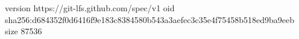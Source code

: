 version https://git-lfs.github.com/spec/v1
oid sha256:d684352f0d6416f9e183c8384580b543a3aefec3c35e4f75458b518ed9ba9eeb
size 87536
